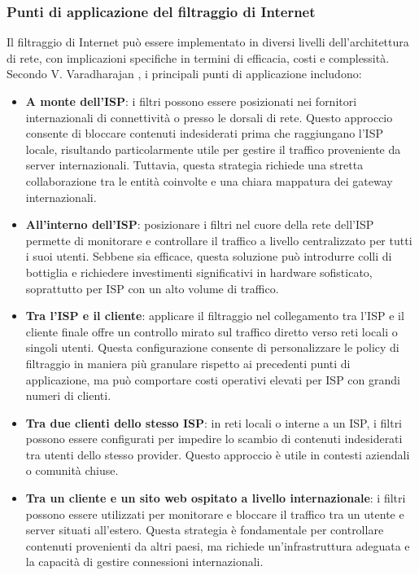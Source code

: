 \subsubsection{Punti di applicazione del filtraggio di Internet}
Il filtraggio di Internet può essere implementato in diversi livelli dell'architettura di rete, con implicazioni specifiche in termini di efficacia, costi e complessità. Secondo V. Varadharajan \cite{Varadharajan2010}, i principali punti di applicazione includono:

\begin{itemize}
  \item \textbf{A monte dell'ISP}: i filtri possono essere posizionati nei fornitori internazionali di connettività o presso le dorsali di rete. Questo approccio consente di bloccare contenuti indesiderati prima che raggiungano l'ISP locale, risultando particolarmente utile per gestire il traffico proveniente da server internazionali. Tuttavia, questa strategia richiede una stretta collaborazione tra le entità coinvolte e una chiara mappatura dei gateway internazionali.

  \item \textbf{All'interno dell'ISP}: posizionare i filtri nel cuore della rete dell'ISP permette di monitorare e controllare il traffico a livello centralizzato per tutti i suoi utenti. Sebbene sia efficace, questa soluzione può introdurre colli di bottiglia e richiedere investimenti significativi in hardware sofisticato, soprattutto per ISP con un alto volume di traffico.

  \item \textbf{Tra l'ISP e il cliente}: applicare il filtraggio nel collegamento tra l'ISP e il cliente finale offre un controllo mirato sul traffico diretto verso reti locali o singoli utenti. Questa configurazione consente di personalizzare le policy di filtraggio in maniera più granulare rispetto ai precedenti punti di applicazione, ma può comportare costi operativi elevati per ISP con grandi numeri di clienti.

  \item \textbf{Tra due clienti dello stesso ISP}: in reti locali o interne a un ISP, i filtri possono essere configurati per impedire lo scambio di contenuti indesiderati tra utenti dello stesso provider. Questo approccio è utile in contesti aziendali o comunità chiuse.

  \item \textbf{Tra un cliente e un sito web ospitato a livello internazionale}: i filtri possono essere utilizzati per monitorare e bloccare il traffico tra un utente e server situati all'estero. Questa strategia è fondamentale per controllare contenuti provenienti da altri paesi, ma richiede un'infrastruttura adeguata e la capacità di gestire connessioni internazionali.
\end{itemize}

